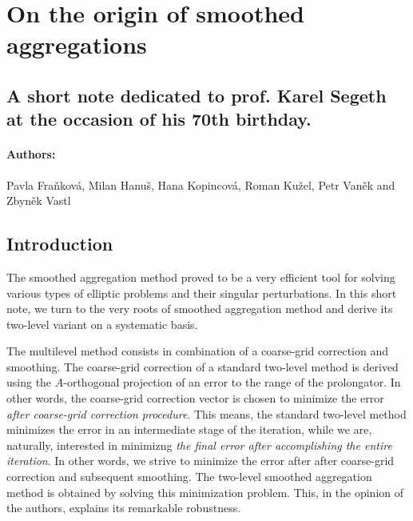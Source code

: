 \chapter{On the origin of smoothed aggregations}\label{app:multigrid}

\section*{A short note dedicated to prof. Karel Segeth at the occasion of his 70th birthday.}

\subsubsection*{Authors:}

Pavla Fra\v{n}kov\'{a}, Milan Hanu\v{s},
Hana Kopincov\'{a}, Roman Ku\v{z}el,
Petr Van\v{e}k and Zbyn\v{e}k Vastl















\section{Introduction}
The smoothed aggregation method
\cite{vanek-accel,FMS,amg-theory,Vanek_Mandel_Brezina_1995} proved
to be a very efficient tool for solving various types
of elliptic problems and their singular perturbations.
In this short note, we turn
to the very roots of smoothed aggregation method and derive its
two-level variant on a systematic basis.

The multilevel method consists in combination of a coarse-grid correction
and smoothing.
The coarse-grid correction of a standard
two-level method is derived using the $A$-orthogonal projection of an
error to the range of the prolongator.
In other words, the coarse-grid correction
vector
is chosen to minimize the error {\em after coarse-grid correction procedure}.
This means, the standard two-level method
minimizes the error in an intermediate stage of the iteration, while
we are, naturally, interested in
minimizng  {\em the final error after accomplishing the entire iteration}.
In other words, we strive to minimize the error after
after coarse-grid correction and
subsequent smoothing. The two-level smoothed aggregation method
is obtained by solving this minimization problem. This, in the opinion
of the authors, explains its remarkable robustness.

